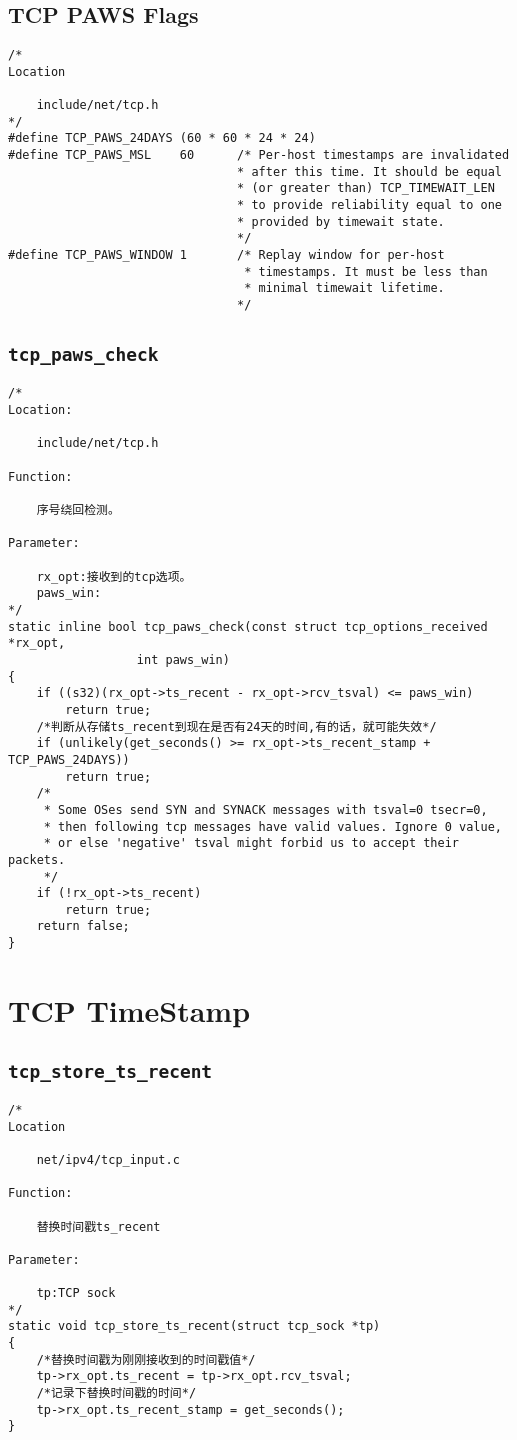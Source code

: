 	\subsection{TCP PAWS Flags}
\begin{verbatim}
/*
Location

	include/net/tcp.h
*/
#define TCP_PAWS_24DAYS	(60 * 60 * 24 * 24)
#define TCP_PAWS_MSL	60		/* Per-host timestamps are invalidated
					 			* after this time. It should be equal
					 			* (or greater than) TCP_TIMEWAIT_LEN
					 			* to provide reliability equal to one
					 			* provided by timewait state.
								*/
#define TCP_PAWS_WINDOW	1		/* Replay window for per-host
								 * timestamps. It must be less than
					 			 * minimal timewait lifetime.
					 			*/
\end{verbatim}

	\subsection{\texttt{tcp_paws_check}}

\begin{verbatim}
/*
Location:

	include/net/tcp.h

Function:

	序号绕回检测。

Parameter:
	
	rx_opt:接收到的tcp选项。
	paws_win:
*/
static inline bool tcp_paws_check(const struct tcp_options_received *rx_opt,
				  int paws_win)
{
	if ((s32)(rx_opt->ts_recent - rx_opt->rcv_tsval) <= paws_win)
		return true;
	/*判断从存储ts_recent到现在是否有24天的时间,有的话，就可能失效*/
	if (unlikely(get_seconds() >= rx_opt->ts_recent_stamp + TCP_PAWS_24DAYS))
		return true;
	/*
	 * Some OSes send SYN and SYNACK messages with tsval=0 tsecr=0,
	 * then following tcp messages have valid values. Ignore 0 value,
	 * or else 'negative' tsval might forbid us to accept their packets.
	 */
	if (!rx_opt->ts_recent)
		return true;
	return false;
}
\end{verbatim}


\section{TCP TimeStamp}
	\subsection{\texttt{tcp_store_ts_recent}}
\begin{verbatim}
/*
Location

	net/ipv4/tcp_input.c

Function:

	替换时间戳ts_recent

Parameter:

	tp:TCP sock
*/
static void tcp_store_ts_recent(struct tcp_sock *tp)
{
	/*替换时间戳为刚刚接收到的时间戳值*/
	tp->rx_opt.ts_recent = tp->rx_opt.rcv_tsval;
	/*记录下替换时间戳的时间*/
	tp->rx_opt.ts_recent_stamp = get_seconds();
}
\end{verbatim}
